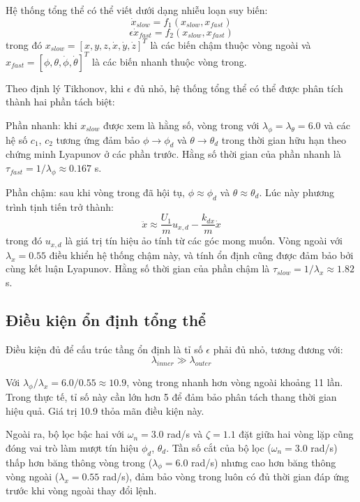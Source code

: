 \documentclass[12pt,a4paper]{report}
\begin{document}
Hệ thống tổng thể có thể viết dưới dạng nhiễu loạn suy biến:
\begin{equation}
\dot{x}_{slow} = f_1(x_{slow}, x_{fast})
\end{equation}
\begin{equation}
\epsilon \dot{x}_{fast} = f_2(x_{slow}, x_{fast})
\end{equation}
trong đó $x_{slow} = [x, y, z, \dot{x}, \dot{y}, \dot{z}]^T$ là các biến chậm thuộc vòng ngoài và $x_{fast} = [\phi, \theta, \dot{\phi}, \dot{\theta}]^T$ là các biến nhanh thuộc vòng trong.

Theo định lý Tikhonov, khi $\epsilon$ đủ nhỏ, hệ thống tổng thể có thể được phân tích thành hai phần tách biệt:

Phần nhanh: khi $x_{slow}$ được xem là hằng số, vòng trong với $\lambda_\phi = \lambda_\theta = 6.0$ và các hệ số $c_1$, $c_2$ tương ứng đảm bảo $\phi \to \phi_d$ và $\theta \to \theta_d$ trong thời gian hữu hạn theo chứng minh Lyapunov ở các phần trước. Hằng số thời gian của phần nhanh là $\tau_{fast} = 1/\lambda_\phi \approx 0.167$ s.

Phần chậm: sau khi vòng trong đã hội tụ, $\phi \approx \phi_d$ và $\theta \approx \theta_d$. Lúc này phương trình tịnh tiến trở thành:
\begin{equation}
\ddot{x} \approx \frac{U_1}{m} u_{x,d} - \frac{k_{dx}}{m} \dot{x}
\end{equation}
trong đó $u_{x,d}$ là giá trị tín hiệu ảo tính từ các góc mong muốn. Vòng ngoài với $\lambda_x = 0.55$ điều khiển hệ thống chậm này, và tính ổn định cũng được đảm bảo bởi cùng kết luận Lyapunov. Hằng số thời gian của phần chậm là $\tau_{slow} = 1/\lambda_x \approx 1.82$ s.

\subsection{Điều kiện ổn định tổng thể}
Điều kiện đủ để cấu trúc tầng ổn định là tỉ số $\epsilon$ phải đủ nhỏ, tương đương với:
\begin{equation}
\lambda_{inner} \gg \lambda_{outer}
\end{equation}

Với $\lambda_\phi / \lambda_x = 6.0 / 0.55 \approx 10.9$, vòng trong nhanh hơn vòng ngoài khoảng 11 lần. Trong thực tế, tỉ số này cần lớn hơn 5 để đảm bảo phân tách thang thời gian hiệu quả. Giá trị 10.9 thỏa mãn điều kiện này.

Ngoài ra, bộ lọc bậc hai với $\omega_n = 3.0$ rad/s và $\zeta = 1.1$ đặt giữa hai vòng lặp cũng đóng vai trò làm mượt tín hiệu $\phi_d$, $\theta_d$. Tần số cắt của bộ lọc ($\omega_n = 3.0$ rad/s) thấp hơn băng thông vòng trong ($\lambda_\phi = 6.0$ rad/s) nhưng cao hơn băng thông vòng ngoài ($\lambda_x = 0.55$ rad/s), đảm bảo vòng trong luôn có đủ thời gian đáp ứng trước khi vòng ngoài thay đổi lệnh.
\end{document}
